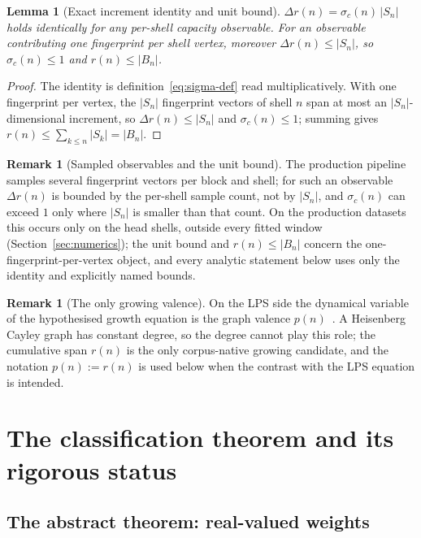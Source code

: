 \documentclass[11pt,a4paper]{article}
\newtheorem{lemma}[theorem]{Lemma}
\theoremstyle{definition}
\newtheorem{remark}[theorem]{Remark}
\begin{document}
\begin{lemma}[Exact increment identity and unit bound]
  \label{lem:identity}
  $\Delta r(n) = \sigma_c(n)\,|S_n|$ holds identically for any per-shell capacity observable.
  For an observable contributing one fingerprint per shell vertex, moreover $\Delta r(n) \le |S_n|$, so
  $\sigma_c(n) \le 1$ and $r(n) \le |B_n|$.
\end{lemma}

\begin{proof}
  The identity is definition~\eqref{eq:sigma-def} read multiplicatively.
  With one fingerprint per vertex, the $|S_n|$ fingerprint vectors of shell $n$ span at most an
  $|S_n|$-dimensional increment, so $\Delta r(n) \le |S_n|$ and $\sigma_c(n) \le 1$; summing gives
  $r(n) \le \sum_{k\le n}|S_k| = |B_n|$.
\end{proof}

\begin{remark}[Sampled observables and the unit bound]
  \label{rem:sampled}
  The production pipeline samples several fingerprint vectors per block and shell; for such an observable
  $\Delta r(n)$ is bounded by the per-shell sample count, not by $|S_n|$, and $\sigma_c(n)$ can exceed $1$
  only where $|S_n|$ is smaller than that count.
  On the production datasets this occurs only on the head shells, outside every fitted window
  (Section~\ref{sec:numerics}); the unit bound and $r(n) \le |B_n|$ concern the one-fingerprint-per-vertex
  object, and every analytic statement below uses only the identity and explicitly named bounds.
\end{remark}

\begin{remark}[The only growing valence]
  \label{rem:valence}
  On the LPS side the dynamical variable of the hypothesised growth equation is the graph valence
  $p(n)$~\cite{Beau2026a8,Beau2026a10}.
  A Heisenberg Cayley graph has constant degree, so the degree cannot play this role; the cumulative span
  $r(n)$ is the only corpus-native growing candidate, and the notation $p(n) := r(n)$ is used below when the
  contrast with the LPS equation is intended.
\end{remark}

\section{The classification theorem and its rigorous status}
\label{sec:theorem}

\subsection{The abstract theorem: real-valued weights}
\label{ssec:abstract-theorem}
\end{document}

